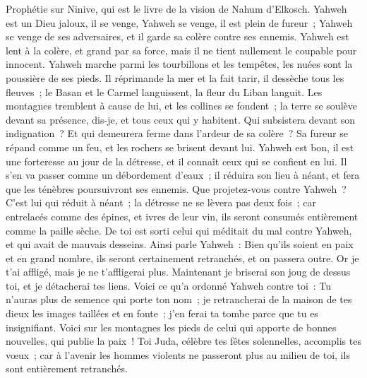 \begin{multicols}{2}
\VerseOne{}Prophétie sur Ninive, qui est le livre de la vision de Nahum d'Elkosch.
Yahweh est un Dieu jaloux, il se venge, Yahweh se venge, il est plein de fureur~; Yahweh se venge de ses adversaires, et il garde sa colère contre ses ennemis.
Yahweh est lent à la colère, et grand par sa force, mais il ne tient nullement le coupable pour innocent. Yahweh marche parmi les tourbillons et les tempêtes, les nuées sont la poussière de ses pieds.
Il réprimande la mer et la fait tarir, il dessèche tous les fleuves~; le Basan et le Carmel languissent, la fleur du Liban languit.
Les montagnes tremblent à cause de lui, et les collines se fondent~; la terre se soulève devant sa présence, dis-je, et tous ceux qui y habitent.
Qui subsistera devant son indignation~? Et qui demeurera ferme dans l'ardeur de sa colère~? Sa fureur se répand comme un feu, et les rochers se brisent devant lui.
Yahweh est bon, il est une forteresse au jour de la détresse, et il connaît ceux qui se confient en lui.
Il s'en va passer comme un débordement d'eaux~; il réduira son lieu à néant, et fera que les ténèbres poursuivront ses ennemis.
Que projetez-vous contre Yahweh~? C'est lui qui réduit à néant~; la détresse ne se lèvera pas deux fois~;
car entrelacés comme des épines, et ivres de leur vin, ils seront consumés entièrement comme la paille sèche.
De toi est sorti celui qui méditait du mal contre Yahweh, et qui avait de mauvais desseins.
Ainsi parle Yahweh~: Bien qu'ils soient en paix et en grand nombre, ils seront certainement retranchés, et on passera outre. Or je t'ai affligé, mais je ne t'affligerai plus.
Maintenant je briserai son joug de dessus toi, et je détacherai tes liens.
Voici ce qu'a ordonné Yahweh contre toi~: Tu n'auras plus de semence qui porte ton nom~; je retrancherai de la maison de tes dieux les images taillées et en fonte~; j'en ferai ta tombe parce que tu es insignifiant.
\VerseOne{}Voici sur les montagnes les pieds de celui qui apporte de bonnes nouvelles, qui publie la paix~! Toi Juda, célèbre tes fêtes solennelles, accomplis tes vœux~; car à l'avenir les hommes violents ne passeront plus au milieu de toi, ils sont entièrement retranchés.

\end{multicols}
